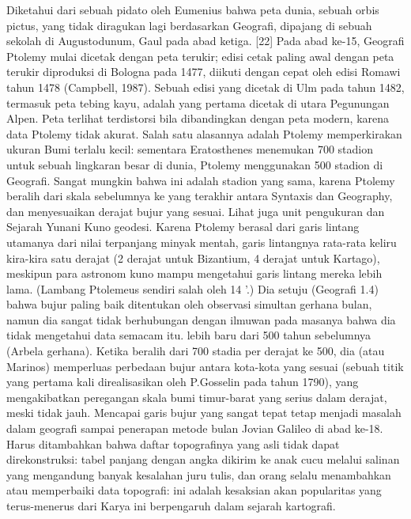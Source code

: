   Diketahui dari sebuah pidato oleh Eumenius bahwa peta dunia, sebuah orbis pictus, yang tidak diragukan lagi berdasarkan Geografi, 
  dipajang di sebuah sekolah di Augustodunum, Gaul pada abad ketiga. [22] Pada abad ke-15, Geografi Ptolemy mulai dicetak dengan peta 
  terukir; edisi cetak paling awal dengan peta terukir diproduksi di Bologna pada 1477, diikuti dengan cepat oleh edisi Romawi tahun 1478
  (Campbell, 1987). Sebuah edisi yang dicetak di Ulm pada tahun 1482, termasuk peta tebing kayu, adalah yang pertama dicetak di utara 
  Pegunungan Alpen. Peta terlihat terdistorsi bila dibandingkan dengan peta modern, karena data Ptolemy tidak akurat. Salah satu
  alasannya adalah Ptolemy memperkirakan ukuran Bumi terlalu kecil: sementara Eratosthenes menemukan 700 stadion untuk sebuah lingkaran
  besar di dunia, Ptolemy menggunakan 500 stadion di Geografi. Sangat mungkin bahwa ini adalah stadion yang sama, karena Ptolemy beralih 
  dari skala sebelumnya ke yang terakhir antara Syntaxis dan Geography, dan menyesuaikan derajat bujur yang sesuai. Lihat juga unit
  pengukuran dan Sejarah Yunani Kuno geodesi.
	Karena Ptolemy berasal dari garis lintang utamanya dari nilai terpanjang minyak mentah, garis lintangnya rata-rata keliru kira-kira
  satu derajat (2 derajat untuk Bizantium, 4 derajat untuk Kartago), meskipun para astronom kuno mampu mengetahui garis lintang mereka 
  lebih lama. (Lambang Ptolemeus sendiri salah oleh 14 '.) Dia setuju (Geografi 1.4) bahwa bujur paling baik ditentukan oleh observasi 
  simultan gerhana bulan, namun dia sangat tidak berhubungan dengan ilmuwan pada masanya bahwa dia tidak mengetahui data semacam itu.
  lebih baru dari 500 tahun sebelumnya (Arbela gerhana). Ketika beralih dari 700 stadia per derajat ke 500, dia (atau Marinos) memperluas
  perbedaan bujur antara kota-kota yang sesuai (sebuah titik yang pertama kali direalisasikan oleh P.Gosselin pada tahun 1790),
  yang mengakibatkan peregangan skala bumi timur-barat yang serius dalam derajat, meski tidak jauh. Mencapai garis bujur yang sangat 
  tepat tetap menjadi masalah dalam geografi sampai penerapan metode bulan Jovian Galileo di abad ke-18. Harus ditambahkan bahwa daftar 
  topografinya yang asli tidak dapat direkonstruksi: tabel panjang dengan angka dikirim ke anak cucu melalui salinan yang mengandung 
  banyak kesalahan juru tulis, dan orang selalu menambahkan atau memperbaiki data topografi: ini adalah kesaksian akan popularitas yang 
  terus-menerus dari Karya ini berpengaruh dalam sejarah kartografi.
	

